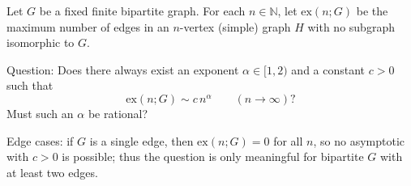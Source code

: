 Let $G$ be a fixed finite bipartite graph. For each $n\in\mathbb N$, let $\mathrm{ex}(n;G)$ be the maximum number of edges in an $n$-vertex (simple) graph $H$ with no subgraph isomorphic to $G$.

Question: Does there always exist an exponent $\alpha\in[1,2)$ and a constant $c>0$ such that
\[
\mathrm{ex}(n;G) \sim c\,n^{\alpha}\qquad (n\to\infty)?
\]
Must such an $\alpha$ be rational?

Edge cases: if $G$ is a single edge, then $\mathrm{ex}(n;G)=0$ for all $n$, so no asymptotic with $c>0$ is possible; thus the question is only meaningful for bipartite $G$ with at least two edges.
